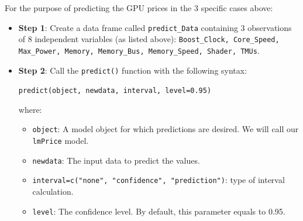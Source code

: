 \documentclass[a4paper]{article}
\begin{document}
For the purpose of predicting the GPU prices in the 3 specific cases above:
\begin{itemize}
    \item \textbf{Step 1}: Create a data frame called \verb|predict_Data| containing 3 observations of 8 independent variables (as listed above): \texttt{Boost\_Clock, Core\_Speed, Max\_Power, Memory, Memory\_Bus, Memory\_Speed, Shader, TMUs}.
    \item \textbf{Step 2}: Call the \verb|predict()| function with the following syntax:
    \begin{center}
        \verb|predict(object, newdata, interval, level=0.95)|
    \end{center}
    where:
    \begin{itemize}
        \item \verb|object|: A model object for which predictions are desired. We will call our \verb|lmPrice| model.
        \item \verb|newdata|: The input data to predict the values.
        \item \verb|interval=c("none", "confidence", "prediction")|: type of interval calculation.
        \item \verb|level|: The confidence level. By default, this parameter equals to 0.95. 
    \end{itemize}
\end{itemize}
\end{document}
